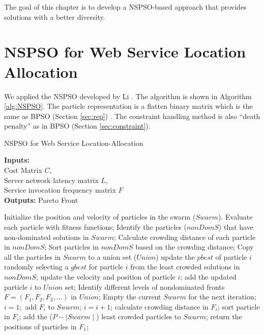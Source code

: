 The goal of this chapter is to develop a NSPSO-based approach that provides solutions with 
a better diversity.

\section{NSPSO for Web Service Location Allocation}
We applied the NSPSO developed by Li \cite{NSPSO}. The algorithm is shown in Algorithm \ref{alg:NSPSO}. 
The particle representation is a flatten binary matrix which is the same as BPSO (Section \ref{sec:rep}) .
The constraint handling method is also ``death penalty'' as in BPSO (Section \ref{sec:constraint}).


\begin{algorithm}[!h]
	\caption{NSPSO for Web Service Location-Allocation}
	\footnotesize
	\textbf{Inputs:} \\
		Cost Matrix $C$, \\
		Server network latency matrix $L$, \\
		Service invocation frequency matrix $F$ \\

	\textbf{Outputs:}
		Pareto Front

	\begin{algorithmic}[1]
		\State Initialize the position and velocity of particles in the swarm ($Swarm$).
		\Repeat
			\State Evaluate each particle with fitness functions;
			\State Identify the particles ($nonDomS$) that have non-dominated solutions in $Swarm$;
			\State Calculate crowding distance of each particle in $nonDomS$;
			\State Sort particles in $nonDomS$ based on the crowding distance;
			\State Copy all the particles in $Swarm$ to a union set ($Union$)
			  \State update the $pbest$ of particle $i$
			  \State randomly selecting a $gbest$ for particle $i$ from the least crowded solutions in $nonDomS$;
			  \State update the velocity and position of particle $i$;
			  \State add the updated particle $i$ to $Union$ set;
			\EndFor
		\State Identify different levels of nondominated fronts $F = (F_1, F_2, F_3, \dots)$ in $Union$;
		\State Empty the current $Swarm$ for the next iteration;
		\State $i = 1;$
		    \State add $F_i$ to $Swarm$;
		    \State $i = i + 1$;
		  \EndIf
		    \State calculate crowding distance in $F_i$;
		    \State sort particle in $F_i$;
		    \State add the ($P - \mid Swarm \mid$) least crowded particles to $Swarm$;
		  \EndIf
		\EndWhile
		\State return the positions of particles in $F_1$;
	\end{algorithmic}
	\label{alg:NSPSO}
\end{algorithm}



